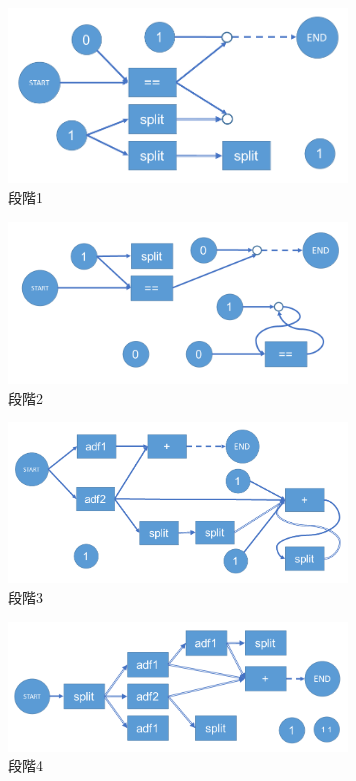 \documentclass[exploratorypaper]{jsaiart} %
\begin{document}
\begin{figure}[t]
    \begin{center}
        \includegraphics[width=90mm]{out_net1.PNG}
    \end{center}
    \capwidth=90mm %
    \caption{段階1}
    \label{fig:out_net1}
\end{figure}
\begin{figure}[t]
    \begin{center}
        \includegraphics[width=90mm]{out_net2.PNG}
    \end{center}
    \capwidth=90mm %
    \caption{段階2}
    \label{fig:out_net2}
\end{figure}
\begin{figure}[t]
    \begin{center}
        \includegraphics[width=90mm]{out_net3.PNG}
    \end{center}
    \capwidth=90mm %
    \caption{段階3}
    \label{fig:out_net3}
\end{figure}
\begin{figure}[t]
    \begin{center}
        \includegraphics[width=90mm]{out_net4.PNG}
    \end{center}
    \capwidth=90mm %
    \caption{段階4}
    \label{fig:out_net4}
\end{figure}
\end{document}
